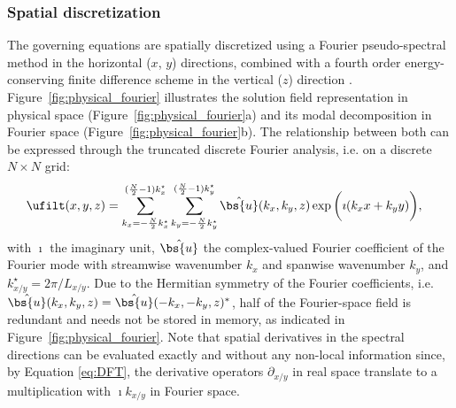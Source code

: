 \subsubsection{Spatial discretization}
The governing equations are spatially discretized using a Fourier pseudo-spectral method in the horizontal ($x$, $y$) directions, combined with a fourth order energy-conserving finite difference scheme in the vertical ($z$) direction \citep{verstappen2003symmetry}. Figure~\ref{fig:physical_fourier} illustrates the solution field representation in physical space (Figure~\ref{fig:physical_fourier}a) and its modal decomposition in Fourier space (Figure~\ref{fig:physical_fourier}b). The relationship between both can be expressed through the truncated discrete Fourier analysis, i.e. on a discrete $N \times N$ grid:
\begin{align}
	\ufilt(x, y, z) &= \sum_{k_x = -\frac{N}{2} k^\star_x}^{(\frac{N}{2} - 1) k^\star_x} \sum_{k_y = -\frac{N}{2} k^\star_y}^{(\frac{N}{2} - 1) k^\star_y}    \hat{\bs{u}} (k_x, k_y, z) \exp\bigg( \imath (k_x x + k_y y) \bigg), \label{eq:DFT}
\end{align}
with $\imath$ the imaginary unit, $\hat{\bs{u}}$ the complex-valued Fourier coefficient of the Fourier mode with streamwise wavenumber $k_x$ and spanwise wavenumber $k_y$, and $k^\star_{x/y} = 2\pi/L_{x/y}$. Due to the Hermitian symmetry of the Fourier coefficients, i.e. $\hat{\bs{u}}(k_x, k_y, z) = \hat{\bs{u}}(-k_x, -k_y, z)^* $, half of the Fourier-space field is redundant and needs not be stored in memory, as indicated in Figure~\ref{fig:physical_fourier}. Note that spatial derivatives in the spectral directions can be evaluated exactly and without any non-local information since, by Equation \eqref{eq:DFT}, the derivative operators $\partial_{x/y}$ in real space translate to a multiplication with $\imath k_{x/y}$ in Fourier space. 

